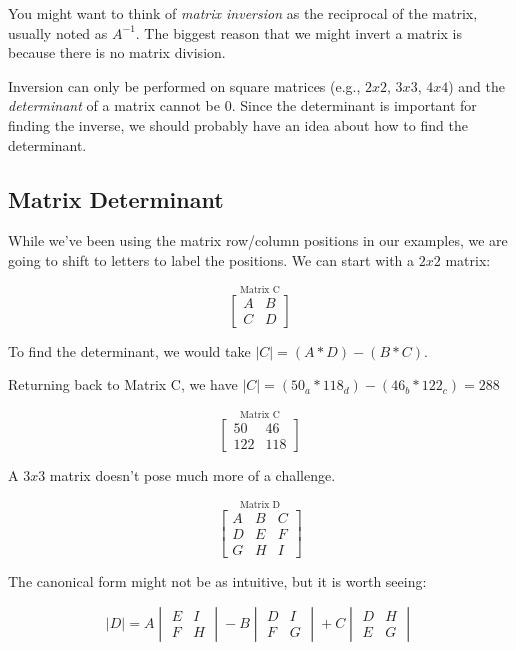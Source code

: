 \documentclass[
  letterpaper,
]{krantz}
\begin{document}
You might want to think of \emph{matrix inversion} as the reciprocal of
the matrix, usually noted as \(A^{-1}\). The biggest reason that we
might invert a matrix is because there is no matrix division.

Inversion can only be performed on square matrices (e.g., \(2x2\),
\(3x3\), \(4x4\)) and the \emph{determinant} of a matrix cannot be 0.
Since the determinant is important for finding the inverse, we should
probably have an idea about how to find the determinant.

\subsection{Matrix Determinant}\label{matrix-determinant}

While we've been using the matrix row/column positions in our examples,
we are going to shift to letters to label the positions. We can start
with a \(2x2\) matrix:

\[
\stackrel{\mbox{Matrix C}}{
\begin{bmatrix}
A & B\\
C & D
\end{bmatrix}
}
\]

To find the determinant, we would take \(\mid C \mid = (A*D) - (B*C)\).

Returning back to Matrix C, we have
\(\mid C \mid = (50_a*118_d) - (46_b*122_c) = 288\)

\[
\stackrel{\mbox{Matrix C}}{
\begin{bmatrix}
50 & 46\\
122 & 118
\end{bmatrix}
}
\]

A \(3x3\) matrix doesn't pose much more of a challenge.

\[
\stackrel{\mbox{Matrix D}}{
\begin{bmatrix}
A & B & C\\
D & E & F\\
G & H & I
\end{bmatrix}
}
\]

The canonical form might not be as intuitive, but it is worth seeing:

\[
\mid D \mid = A\begin{vmatrix}
E & I\\
F & H
\end{vmatrix}  - 
B\begin{vmatrix}
D & I\\
F & G
\end{vmatrix} + 
C\begin{vmatrix}
D & H\\
E & G
\end{vmatrix}
\]
\end{document}
